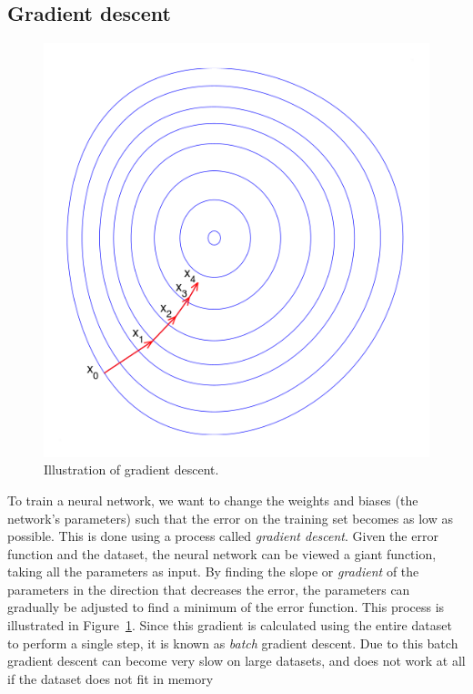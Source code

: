 \documentclass{kththesis}
\begin{document}
\subsection{Gradient descent}
\begin{figure}
  \includegraphics[width=1.6\linewidth]{img/gradient_descent.png}
  \caption{Illustration of gradient descent.}
  \label{fig:gradient_descent}
\end{figure}
To train a neural network, we want to change the weights and biases (the network's parameters) such that the error on the training set becomes as low as possible. This is done using a process called \textit{gradient descent}. Given the error function and the dataset, the neural network can be viewed a giant function, taking all the parameters as input. By finding the slope or \textit{gradient} of the parameters in the direction that decreases the error, the parameters can gradually be adjusted to find a minimum of the error function. This process is illustrated in Figure~\ref{fig:gradient_descent}. Since this gradient is calculated using the entire dataset to perform a single step, it is known as \textit{batch} gradient descent. Due to this batch gradient descent can become very slow on large datasets, and does not work at all if the dataset does not fit in memory~\cite{gradient_descent}
\end{document}
